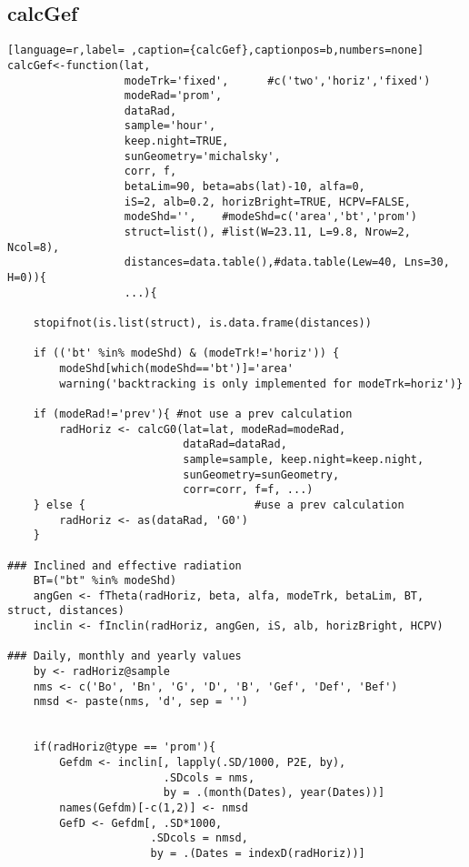 \subsection{calcGef}
\label{sec:org07a3ae3}
\label{subsec:calcgef}
\begin{lstlisting}[language=r,label= ,caption={calcGef},captionpos=b,numbers=none]
calcGef<-function(lat,
                  modeTrk='fixed',      #c('two','horiz','fixed')
                  modeRad='prom', 
                  dataRad,
                  sample='hour',
                  keep.night=TRUE,
                  sunGeometry='michalsky',
                  corr, f,
                  betaLim=90, beta=abs(lat)-10, alfa=0,
                  iS=2, alb=0.2, horizBright=TRUE, HCPV=FALSE,
                  modeShd='',    #modeShd=c('area','bt','prom')
                  struct=list(), #list(W=23.11, L=9.8, Nrow=2, Ncol=8), 
                  distances=data.table(),#data.table(Lew=40, Lns=30, H=0)){
                  ...){

    stopifnot(is.list(struct), is.data.frame(distances))

    if (('bt' %in% modeShd) & (modeTrk!='horiz')) {
        modeShd[which(modeShd=='bt')]='area'
        warning('backtracking is only implemented for modeTrk=horiz')}

    if (modeRad!='prev'){ #not use a prev calculation
        radHoriz <- calcG0(lat=lat, modeRad=modeRad,
                           dataRad=dataRad,
                           sample=sample, keep.night=keep.night,
                           sunGeometry=sunGeometry,
                           corr=corr, f=f, ...)
    } else {                          #use a prev calculation
        radHoriz <- as(dataRad, 'G0') 
    } 

### Inclined and effective radiation
    BT=("bt" %in% modeShd) 
    angGen <- fTheta(radHoriz, beta, alfa, modeTrk, betaLim, BT, struct, distances)
    inclin <- fInclin(radHoriz, angGen, iS, alb, horizBright, HCPV)

### Daily, monthly and yearly values
    by <- radHoriz@sample
    nms <- c('Bo', 'Bn', 'G', 'D', 'B', 'Gef', 'Def', 'Bef')
    nmsd <- paste(nms, 'd', sep = '')


    if(radHoriz@type == 'prom'){
        Gefdm <- inclin[, lapply(.SD/1000, P2E, by),
                        .SDcols = nms,
                        by = .(month(Dates), year(Dates))]
        names(Gefdm)[-c(1,2)] <- nmsd
        GefD <- Gefdm[, .SD*1000,
                      .SDcols = nmsd,
                      by = .(Dates = indexD(radHoriz))]


\end{lstlisting}
